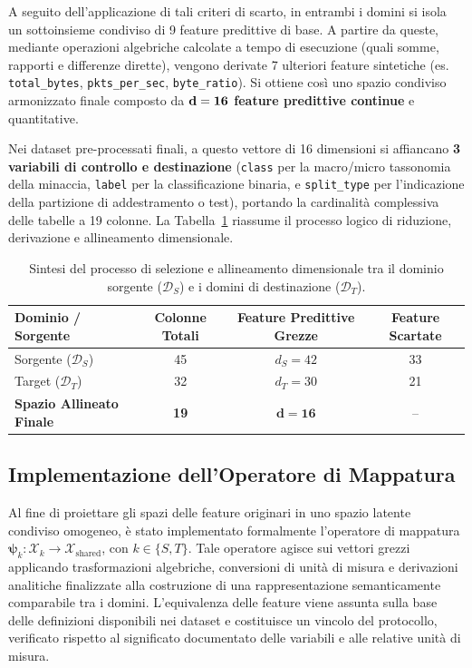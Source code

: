 A seguito dell'applicazione di tali criteri di scarto, in entrambi i domini si isola un sottoinsieme condiviso di 9 feature predittive di base. A partire da queste, mediante operazioni algebriche calcolate a tempo di esecuzione (quali somme, rapporti e differenze dirette), vengono derivate 7 ulteriori feature sintetiche (es. \texttt{total\_bytes}, \texttt{pkts\_per\_sec}, \texttt{byte\_ratio}). Si ottiene così uno spazio condiviso armonizzato finale composto da \textbf{$\bf{d = 16}$ feature predittive continue} e quantitative. 

Nei dataset pre-processati finali, a questo vettore di 16 dimensioni si affiancano \textbf{3 variabili di controllo e destinazione} (\texttt{class} per la macro/micro tassonomia della minaccia, \texttt{label} per la classificazione binaria, e \texttt{split\_type} per l'indicazione della partizione di addestramento o test), portando la cardinalità complessiva delle tabelle a 19 colonne. 
La Tabella~\ref{tab:feature_filtering_summary} riassume il processo logico di riduzione, derivazione e allineamento dimensionale.

\begin{table}[H]
    \centering
    \small
    \caption{Sintesi del processo di selezione e allineamento dimensionale tra il dominio sorgente ($\mathcal{D}_S$) e i domini di destinazione ($\mathcal{D}_T$).}
    \label{tab:feature_filtering_summary}
    \begin{tabular}{lccc}
        \toprule
        \textbf{Dominio / Sorgente} & \textbf{Colonne Totali} & \textbf{Feature Predittive Grezze} & \textbf{Feature Scartate} \\
        \midrule
        Sorgente ($\mathcal{D}_S$) & 45 & $d_S = 42$ & 33 \\
        Target ($\mathcal{D}_T$) & 32 & $d_T = 30$ & 21 \\
        \hline
        \textbf{Spazio Allineato Finale} & \textbf{19} & $\mathbf{d = 16}$ & -- \\
        \bottomrule
    \end{tabular}
\end{table}

\subsection{Implementazione dell'Operatore di Mappatura}
\label{subsec:implementazione_psi}

Al fine di proiettare gli spazi delle feature originari in uno spazio latente condiviso omogeneo, è stato implementato formalmente l'operatore di mappatura $\boldsymbol{\psi}_k : \mathcal{X}_k \to \mathcal{X}_{\text{shared}}$, con $k \in \{S, T\}$. 
Tale operatore agisce sui vettori grezzi applicando trasformazioni algebriche, conversioni di unità di misura e derivazioni analitiche finalizzate alla costruzione di una rappresentazione semanticamente comparabile tra i domini. L'equivalenza delle feature viene assunta sulla base delle definizioni disponibili nei dataset e costituisce un vincolo del protocollo, verificato rispetto al significato documentato delle variabili e alle relative unità di misura.

